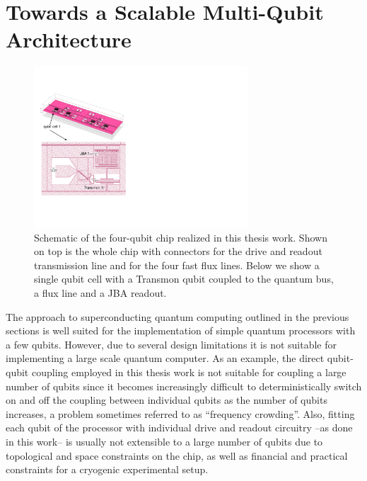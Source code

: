 \section{Towards a Scalable Multi-Qubit Architecture}

\begin{figure}
	\centering
	\includegraphics[width=8cm]{./material/figures/scalable-architecture/scalable_architecture_schematic}
	\caption[Schematic of the four-qubit chip realized in this work]{Schematic of the four-qubit chip realized in this thesis work. Shown on top is the whole chip with connectors for the drive and readout transmission line and for the four fast flux lines. Below we show a single qubit cell with a Transmon qubit coupled to the quantum bus, a flux line and a JBA readout.}
	\label{fig:scalable_architecture_photo}
\end{figure}

The approach to superconducting quantum computing outlined in the previous sections is well suited for the implementation of simple quantum processors with a few qubits. However, due to several design limitations it is not suitable for implementing a large scale quantum computer. As an example, the direct qubit-qubit coupling employed in this thesis work is not suitable for coupling a large number of qubits since it becomes increasingly difficult to deterministically switch on and off the coupling between individual qubits as the number of qubits increases, a problem sometimes referred to as ``frequency crowding''. Also, fitting each qubit of the processor with individual drive and readout circuitry --as done in this work-- is usually not extensible to a large number of qubits due to topological and space constraints on the chip, as well as financial and practical constraints for a cryogenic experimental setup.

\smallskip

